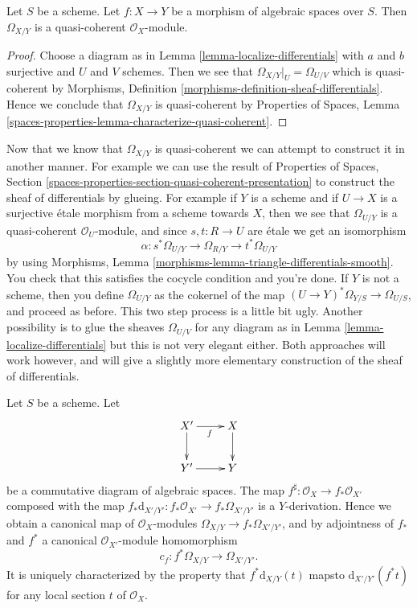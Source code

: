 \begin{lemma}
\label{lemma-module-differentials-quasi-coherent}
Let $S$ be a scheme. Let $f : X \to Y$ be a morphism of algebraic spaces
over $S$. Then $\Omega_{X/Y}$ is a quasi-coherent $\mathcal{O}_X$-module.
\end{lemma}

\begin{proof}
Choose a diagram as in
Lemma \ref{lemma-localize-differentials}
with $a$ and $b$ surjective and $U$ and $V$ schemes.
Then we see that $\Omega_{X/Y}|_U = \Omega_{U/V}$ which is
quasi-coherent by
Morphisms, Definition \ref{morphisms-definition-sheaf-differentials}.
Hence we conclude that $\Omega_{X/Y}$ is quasi-coherent by
Properties of Spaces,
Lemma \ref{spaces-properties-lemma-characterize-quasi-coherent}.
\end{proof}

\begin{remark}
\label{remark-alternative}
Now that we know that $\Omega_{X/Y}$ is quasi-coherent we can attempt
to construct it in another manner. For example we can use the result of
Properties of Spaces,
Section \ref{spaces-properties-section-quasi-coherent-presentation}
to construct the sheaf of differentials by glueing.
For example if $Y$ is a scheme and if $U \to X$ is a surjective \'etale morphism
from a scheme towards $X$, then we see that $\Omega_{U/Y}$ is
a quasi-coherent $\mathcal{O}_U$-module, and since $s, t : R \to U$
are \'etale we get an isomorphism
$$
\alpha : s^*\Omega_{U/Y} \to \Omega_{R/Y} \to t^*\Omega_{U/Y}
$$
by using
Morphisms, Lemma \ref{morphisms-lemma-triangle-differentials-smooth}.
You check that this satisfies the cocycle condition and you're done.
If $Y$ is not a scheme, then you define $\Omega_{U/Y}$ as the cokernel
of the map $(U \to Y)^*\Omega_{Y/S} \to \Omega_{U/S}$, and proceed as
before. This two step process is a little bit ugly. Another possibility
is to glue the sheaves $\Omega_{U/V}$ for any diagram as in
Lemma \ref{lemma-localize-differentials}
but this is not very elegant either. Both approaches will work however, and
will give a slightly more elementary construction of the sheaf of
differentials.
\end{remark}

\begin{lemma}
\label{lemma-functoriality-differentials}
Let $S$ be a scheme. Let
$$
\xymatrix{
X' \ar[d] \ar[r]_f & X \ar[d] \\
Y' \ar[r] & Y
}
$$
be a commutative diagram of algebraic spaces. The map
$f^\sharp : \mathcal{O}_X \to f_*\mathcal{O}_{X'}$ composed with the map
$f_*\text{d}_{X'/Y'} : f_*\mathcal{O}_{X'} \to f_*\Omega_{X'/Y'}$ is a
$Y$-derivation. Hence we obtain a canonical map of $\mathcal{O}_X$-modules
$\Omega_{X/Y} \to f_*\Omega_{X'/Y'}$, and by
adjointness of $f_*$ and $f^*$ a
canonical $\mathcal{O}_{X'}$-module homomorphism
$$
c_f : f^*\Omega_{X/Y} \longrightarrow \Omega_{X'/Y'}.
$$
It is uniquely characterized by the property that
$f^*\text{d}_{X/Y}(t)$ mapsto $\text{d}_{X'/Y'}(f^* t)$
for any local section $t$ of $\mathcal{O}_X$.
\end{lemma}

